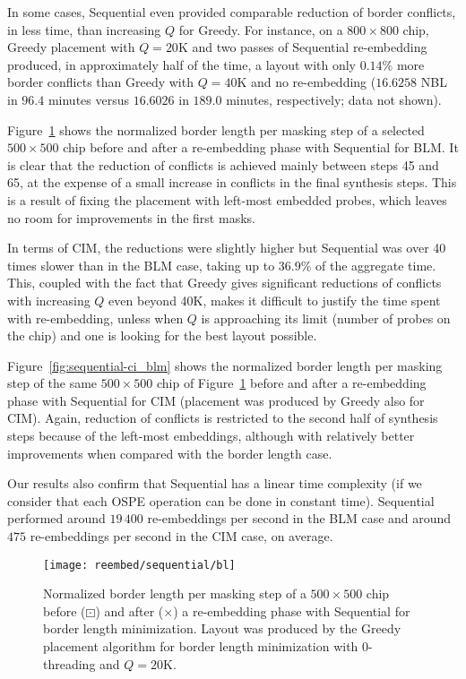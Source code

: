 In some cases, Sequential even provided comparable reduction of border
conflicts, in less time, than increasing $Q$ for Greedy. For instance, on a
$800\times 800$ chip, Greedy placement with $Q=20$K and two passes of Sequential
re-embedding produced, in approximately half of the time, a layout with only
$0.14\%$ more border conflicts than Greedy with $Q=40$K and no re-embedding
($16.6258$ NBL in $96.4$ minutes versus $16.6026$ in $189.0$ minutes,
respectively; data not shown).

Figure~\ref{fig:sequential-bl_blm} shows the normalized border length per
masking step of a selected $500\times 500$ chip before and after a re-embedding
phase with Sequential for BLM. It is clear that the reduction of conflicts is
achieved mainly between steps 45 and 65, at the expense of a small increase in
conflicts in the final synthesis steps. This is a result of fixing the placement
with left-most embedded probes, which leaves no room for improvements in the
first masks.

In terms of CIM, the reductions were slightly higher but Sequential was over 40
times slower than in the BLM case, taking up to $36.9\%$ of the aggregate time.
This, coupled with the fact that Greedy gives significant reductions of
conflicts with increasing $Q$ even beyond 40K, makes it difficult to justify the
time spent with re-embedding, unless when $Q$ is approaching its limit (number
of probes on the chip) and one is looking for the best layout possible.

Figure~\ref{fig:sequential-ci_blm} shows the normalized border length per
masking step of the same $500\times 500$ chip of
Figure~\ref{fig:sequential-bl_blm} before and after a re-embedding phase with
Sequential for CIM (placement was produced by Greedy also for CIM). Again,
reduction of conflicts is restricted to the second half of synthesis steps
because of the left-most embeddings, although with relatively better
improvements when compared with the border length case.

Our results also confirm that Sequential has a linear time complexity (if we
consider that each OSPE operation can be done in constant time). Sequential
performed around $19\,400$ re-embeddings per second in the BLM case and around
$475$ re-embeddings per second in the CIM case, on average.

\begin{figure}[t]\centering
\texttt{[image: reembed/sequential/bl]}
\caption{\label{fig:sequential-bl_blm}
  Normalized border length per masking step of a $500\times 500$ chip before
  ({\tiny $\boxdot$}) and after ({\tiny $\times$}) a re-embedding phase with
  Sequential for border length minimization. Layout was produced by the Greedy
  placement algorithm for border length minimization with $0$-threading and
  $Q=20$K.}
\end{figure}

